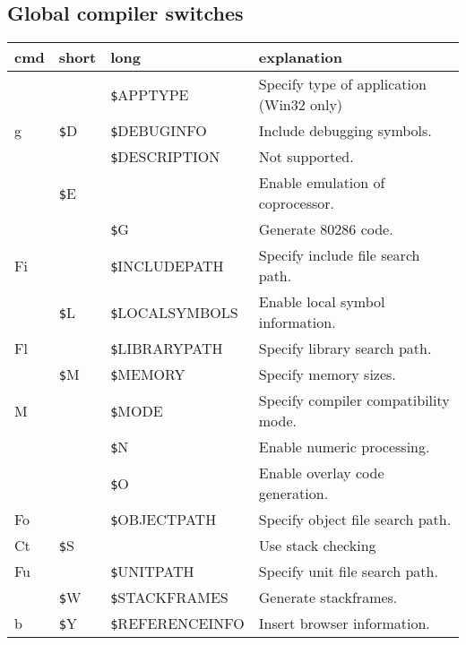 \documentclass{article}
\newcommand{\var}[1]{{\texttt #1}}
\begin{document}
\subsection*{Global compiler switches}
\begin{tabularx}{\textwidth}{lllX}
\textbf{cmd} & \textbf {short} & \textbf {long} & \textbf{explanation }\\ \hline
& & \var{\$APPTYPE} & Specify type of application (Win32 only) \\
g& \var{\$D} & \var{\$DEBUGINFO} & Include debugging symbols. \\
& & \var{\$DESCRIPTION} & Not supported. \\
&\var{\$E} & & Enable emulation of coprocessor. \\
& & \var{\$G} & Generate 80286 code. \\
Fi& & \var{\$INCLUDEPATH} & Specify include file search path. \\
&\var{\$L} & \var{\$LOCALSYMBOLS} & Enable local symbol information. \\
Fl& & \var{\$LIBRARYPATH} & Specify library search path. \\
&\var{\$M} & \var{\$MEMORY} & Specify memory sizes. \\
M& & \var{\$MODE} & Specify compiler compatibility mode. \\
& & \var{\$N} & Enable numeric processing.  \\
& & \var{\$O} & Enable overlay code generation.  \\
Fo& & \var{\$OBJECTPATH} & Specify object file search path. \\
Ct& \var{\$S} & & Use stack checking \\
Fu& & \var{\$UNITPATH} & Specify unit file search path. \\
& \var{\$W} & \var{\$STACKFRAMES} & Generate stackframes. \\
b & \var{\$Y} & \var{\$REFERENCEINFO} & Insert browser information. \\ \hline
\end{tabularx}
\end{document}
